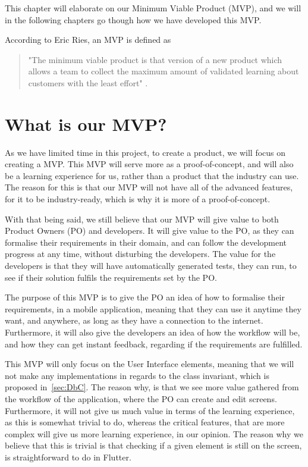 This chapter will elaborate on our Minimum Viable Product (MVP), and we will in the following chapters go though how we have developed this MVP.

According to Eric Ries, an MVP is defined as 
\begin{quote}
    "The minimum viable product is that version of a new product which allows a team to collect the maximum amount of validated learning about customers with the least effort" \cite{whatIsMVP}.
\end{quote}

\section{What is our MVP?}
As we have limited time in this project, to create a product, we will focus on creating a MVP.
This MVP will serve more as a proof-of-concept, and will also be a learning experience for us, rather than a product that the industry can use.
The reason for this is that our MVP will not have all of the advanced features, for it to be industry-ready, which is why it is more of a proof-of-concept.

With that being said, we still believe that our MVP will give value to both Product Owners (PO) and developers.
It will give value to the PO, as they can formalise their requirements in their domain, and can follow the development progress at any time, without disturbing the developers.
The value for the developers is that they will have automatically generated tests, they can run, to see if their solution fulfils the requirements set by the PO. 

The purpose of this MVP is to give the PO an idea of how to formalise their requirements, in a mobile application, meaning that they can use it anytime they want, and anywhere, as long as they have a connection to the internet.
Furthermore, it will also give the developers an idea of how the workflow will be, and how they can get instant feedback, regarding if the requirements are fulfilled. 

This MVP will only focus on the User Interface elements, meaning that we will not make any implementations in regards to the class invariant, which is proposed in~\autoref{sec:DbC}.
The reason why, is that we see more value gathered from the workflow of the application, where the PO can create and edit screens.
Furthermore, it will not give us much value in terms of the learning experience, as this is somewhat trivial to do, whereas the critical features, that are more complex will give us more learning experience, in our opinion.
The reason why we believe that this is trivial is that checking if a given element is still on the screen, is straightforward to do in Flutter.

